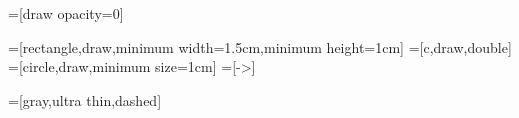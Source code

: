 \usetikzlibrary{calc}

=[draw opacity=0]

=[rectangle,draw,minimum width=1.5cm,minimum height=1cm]
=[c,draw,double]
=[circle,draw,minimum size=1cm]
=[->]

=[gray,ultra thin,dashed]


